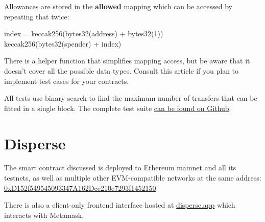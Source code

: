 \documentclass[12pt]{article}
\begin{document}
Allowances are stored in the \textbf{allowed} mapping which can be accessed by repeating that twice:
\begin{center}
index = keccak256(bytes32(address) + bytes32(1)) \\
keccak256(bytes32(spender) + index)	
\end{center}

There is a helper function that simplifies mapping access, but be aware that it doesn't cover all the possible data types.
Consult this article\cite{read-storage} if you plan to implement test cases for your contracts.

All tests use binary search to find the maximum number of transfers that can be fitted in a single block.
The complete test suite \href{https://github.com/banteg/disperse-reseach}{can be found on Github}.

\section{Disperse}

The smart contract discussed is deployed to Ethereum mainnet and all its testnets, as well as multiple other EVM-compatible networks at the same address: \href{https://etherscan.io/address/0xD152f549545093347A162Dce210e7293f1452150}{0xD152f549545093347A162Dce210e7293f1452150}.

There is also a client-only frontend interface hosted at \href{https://disperse.app/}{disperse.app} which interacts with Metamask.
\end{document}
